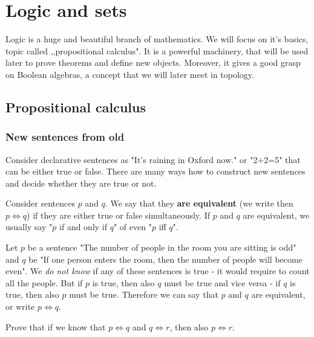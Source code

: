 
\chapter{Logic and sets}
\label{logic_and_sets} %

Logic is a huge and beautiful branch of mathematics. We will focus on it's basics, topic called ,,propositional calculus". It is a powerful machinery, that will be used later
to prove theorems and define new objects. Moreover, it gives a good grasp on Boolean algebras, a concept that we will later meet in topology.

\section{Propositional calculus}
\subsection{New sentences from old}
\label{sec:logic}
Consider declarative sentences as "It's raining in Oxford now." or "2+2=5" that can be either true or false. There are many ways how to construct new sentences and decide
whether they are true or not.

\begin{definition}
  Consider sentences $p$ and $q$. We say that they \textbf{are equivalent} (we write then $p\Leftrightarrow q$) if they are either true or false simultaneously.
  If $p$ and $q$ are equivalent, we usually say "$p$ if and only if $q$" of even "$p$ iff $q$".
\end{definition}

\begin{example}
  Let $p$ be a sentence "The number of people in the room you are sitting is odd" and $q$ be "If one person enters the room, then the number of people will become even".
  We \textit{do not know} if any of these sentences is true - it would require to count all the people. But if $p$ is true, then also $q$ must be true and vice versa - if $q$ is
  true, then also $p$ must be true. Therefore we can say that $p$ and $q$ are equivalent, or write $p\Leftrightarrow q$.
\end{example}

\begin{exercise}
  Prove that if we know that $p\Leftrightarrow q$ and $q\Leftrightarrow r$, then also $p\Leftrightarrow r$.
\end{exercise}

